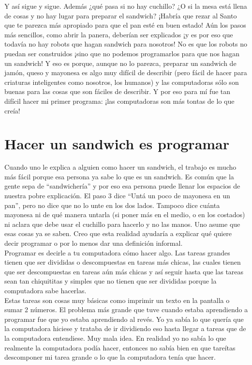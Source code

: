 Y así sigue y sigue. Además ¿qué pasa si no hay cuchillo? ¿O si la mesa está llena de cosas y no hay lugar para preparar el sandwich? ¡Habría que rezar al Santo que te parezca más apropiado para que el pan esté en buen estado! Aún los pasos más sencillos, como abrir la panera, deberían ser explicados ¡y es por eso que todavía no hay robots que hagan sandwich para nosotros! No es que los robots no puedan ser construidos ¡sino que no podemos programarlos para que nos hagan un sandwich! Y eso es porque, aunque no lo parezca, preparar un sandwich de jamón, queso y mayonesa es algo muy difícil de describir (pero fácil de hacer para criaturas inteligentes como nosotros, los humanos) y las computadoras sólo son buenas para las cosas que son fáciles de describir. Y por eso para mí fue tan difícil hacer mi primer programa: ¡las computadoras son más tontas de lo que creía!

\section{Hacer un sandwich es programar}
Cuando uno le explica a alguien como hacer un sandwich, el trabajo es mucho más fácil porque esa persona ya sabe lo que es un sandwich. Es común que la gente sepa de “sandwichería” y por eso esa persona puede llenar los espacios de nuestra pobre explicación. El paso 3 dice “Untá un poco de mayonesa en un pan”, pero no dice que no lo unte en los dos lados. Tampoco dice cuánta mayonesa ni de qué manera untarla (si poner más en el medio, o en los costados) ni aclara que debe usar el cuchillo para hacerlo y no las manos. Uno asume que esas cosas ya se saben. Creo que esta realidad ayudaría a explicar qué quiere decir programar o por lo menos dar una definición informal.\\

Programar es decirle a tu computadora cómo hacer algo. Las tareas grandes tienen que ser divididas o descompuestas en tareas más chicas, las cuales tienen que ser descompuestas en tareas aún más chicas y así seguir hasta que las tareas sean tan chiquititas y simples que no tienen que ser divididas porque la computadora sabe hacerlas.\\

Estas tareas son cosas muy básicas como imprimir un texto en la pantalla o sumar 2 números. El problema más grande que tuve cuando estaba aprendiendo a programar fue que yo estaba aprendiendo al revés. Yo ya sabía lo que quería que la computadora hiciese y trataba de ir dividiendo eso hasta llegar a tareas que de la computadora entendiese. Muy mala idea. En realidad yo no sabía lo que realmente la computadora podía hacer, entonces no sabía bien en que tareítas descomponer mi tarea grande o lo que la computadora tenía que hacer.\\
 	
